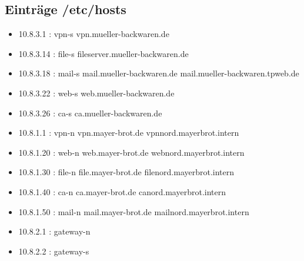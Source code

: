 \subsection{Einträge /etc/hosts}
\begin{itemize}
  \item 10.8.3.1 : vpn-s vpn.mueller-backwaren.de
  \item 10.8.3.14 : file-s fileserver.mueller-backwaren.de
  \item 10.8.3.18 : mail-s mail.mueller-backwaren.de mail.mueller-backwaren.tpweb.de
  \item 10.8.3.22 : web-s web.mueller-backwaren.de
  \item 10.8.3.26 : ca-s ca.mueller-backwaren.de
  \item 10.8.1.1 : vpn-n vpn.mayer-brot.de vpnnord.mayerbrot.intern
  \item 10.8.1.20 : web-n web.mayer-brot.de webnord.mayerbrot.intern
  \item 10.8.1.30 : file-n file.mayer-brot.de filenord.mayerbrot.intern
  \item 10.8.1.40 : ca-n ca.mayer-brot.de canord.mayerbrot.intern
  \item 10.8.1.50 : mail-n mail.mayer-brot.de mailnord.mayerbrot.intern
  \item 10.8.2.1 : gateway-n
  \item 10.8.2.2 : gateway-s
\end{itemize}
